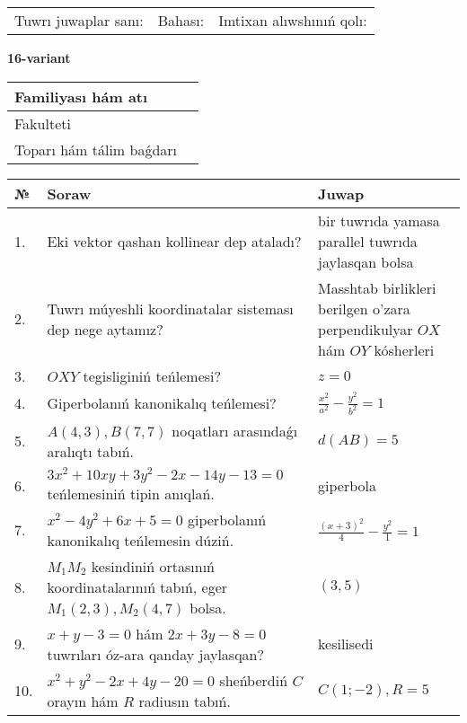 \documentclass{article}
\begin{document}
\vspace{1cm}

\begin{tabular}{lll}
Tuwrı juwaplar sanı: \underline{\hspace{1.5cm}} & 
Bahası: \underline{\hspace{1.5cm}} & 
Imtixan alıwshınıń qolı: \underline{\hspace{2cm}} \\
\end{tabular}

\egroup

\newpage


\textbf{16-variant}\\

\bgroup
\def\arraystretch{1.6} %

\begin{tabular}{|m{5.7cm}|m{9.5cm}|}
\hline
Familiyası hám atı & \\
\hline
Fakulteti  & \\
\hline
Toparı hám tálim baǵdarı  & \\
\hline
\end{tabular}

\vspace{1cm}

\begin{tabular}{|m{0.7cm}|m{10cm}|m{4cm}|}
\hline
№ & Soraw & Juwap \\
\hline
1. & Eki vektor qashan kollinear dep ataladı? & bir tuwrıda yamasa parallel tuwrıda jaylasqan bolsa \\
\hline
2. & Tuwrı múyeshli koordinatalar sisteması dep nege aytamız? & Masshtab birlikleri berilgen o'zara perpendikulyar $OX$ hám $OY$ kósherleri \\
\hline
3. & $OXY$ tegisliginiń teńlemesi? & $z=0$ \\
\hline
4. & Giperbolanıń kanonikalıq teńlemesi? & $\frac{x^2}{a^2}-\frac{y^2}{b^2}=1$ \\
\hline
5. & $A(4, 3), B(7, 7)$ noqatları arasındaǵı aralıqtı tabıń. & $d(AB)=5$ \\
\hline
6. & $3x^{2}+10xy+3y^{2}-2x-14y-13=0$ teńlemesiniń tipin anıqlań. & giperbola \\
\hline
7. & $x^{2}-4y^{2}+6x+5=0$ giperbolanıń kanonikalıq teńlemesin dúziń. & $\frac{(x+3)^{2}}{4}-\frac{y^{2}}{1}=1$ \\
\hline
8. & $M_{1}M_{2}$ kesindiniń ortasınıń koordinatalarınıń tabıń, eger $M_{1} (2, 3), M_{2} (4, 7)$ bolsa. & $(3,5)$ \\
\hline
9. & $x+y-3=0$ hám $2x+3y-8=0$ tuwrıları óz-ara qanday jaylasqan? & kesilisedi \\
\hline
10. & $x^{2}+y^{2}-2x+4y-20=0$ sheńberdiń $C$ orayın hám $R$ radiusın tabıń. & $C(1;-2), R=5$ \\
\hline
\end{tabular}
\end{document}
